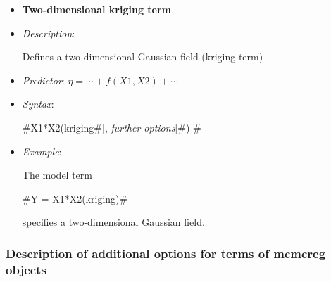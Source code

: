 \begin{itemize}
\item[] {\bf\sffamily Two-dimensional kriging term}

\item[] {\em Description}:

Defines a two dimensional Gaussian field (kriging term)

\item[] {\em Predictor}: $\eta= \cdots + f(X1,X2) + \cdots$
\item[] {\em Syntax}:

#X1*X2(kriging#[, {\em further options}]#) #
\item[] {\em Example}:

The model term

#Y = X1*X2(kriging)#

specifies a two-dimensional Gaussian field.



%
%
%
%
%
%
%
%
%
\end{itemize}



\subsubsection{Description of additional options for terms of mcmcreg objects}
\label{mcmclocaloptions}

